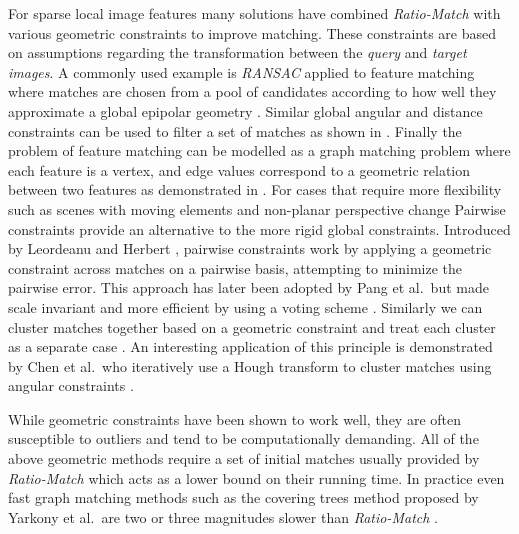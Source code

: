 \documentclass[10pt,twocolumn,letterpaper]{article}
\begin{document}
For sparse local image features many solutions have combined \emph{Ratio-Match} with various geometric constraints to improve matching. These constraints are based on assumptions regarding the transformation between the \emph{query} and \emph{target images}. A commonly used example is \emph{RANSAC} applied to feature matching where matches are chosen from a pool of candidates according to how well they approximate a global epipolar geometry \cite{fischler1981ransac,torr2000mlesac,szeliski2010}. Similar global angular and distance constraints can be used to filter a set of matches as shown in \cite{kim2008efficient,schmid1997local}. Finally the problem of feature matching can be modelled as a graph matching problem where each feature is a vertex, and edge values correspond to a geometric relation between two features as demonstrated in \cite{torresani2008feature,yarkony2010covering,cho2010reweighted}. For cases that require more flexibility such as scenes with moving elements and non-planar perspective change Pairwise constraints provide an alternative to the more rigid global constraints. Introduced by Leordeanu and Herbert \cite{leordeanu2005spectral}, pairwise constraints work by applying a geometric constraint across matches on a pairwise basis, attempting to minimize the pairwise error. This approach has later been adopted by Pang et al.\ but made scale invariant and more efficient by using a voting scheme \cite{yuan2012efficient,pang2012scale}. Similarly we can cluster matches together based on a geometric constraint and treat each cluster as a separate case \cite{cho2009feature,wu2011robust}. An interesting application of this principle is demonstrated by Chen et al.\ who iteratively use a Hough transform to cluster matches using angular constraints \cite{chen2013robust}.

While geometric constraints have been shown to work well, they are often susceptible to outliers and tend to be computationally demanding. All of the above geometric methods require a set of initial matches usually provided by \emph{Ratio-Match} which acts as a lower bound on their running time. In practice even fast graph matching methods such as the covering trees method proposed by Yarkony et al.\ are two or three magnitudes slower than \emph{Ratio-Match} \cite{yarkony2010covering}.
\end{document}
